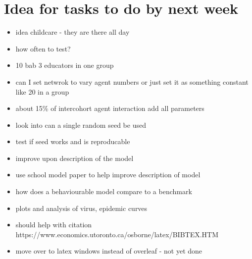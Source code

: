 \documentclass{article}
\begin{document}
\section{Idea for tasks to do by next week}
\begin{itemize}
\item idea childcare - they are there all day
\item how often to test?
\item 10 bab 3 educators in one group
\item can I set netwrok to vary agent numbers or just set it as something constant like 20 in a group
\item about 15\% of intercohort agent interaction
\add add all parameters 
\item look into can a single random seed be used
\item test if seed works and is reproducable
\item improve upon description of the model
\item use school model paper to help improve description of model
\item how does a behaviourable model compare to a benchmark
\item plots and analysis of virus, epidemic curves
\item should help with citation https://www.economics.utoronto.ca/osborne/latex/BIBTEX.HTM
 

\item move over to latex windows instead of overleaf - not yet done
\end{itemize}
\end{document}
